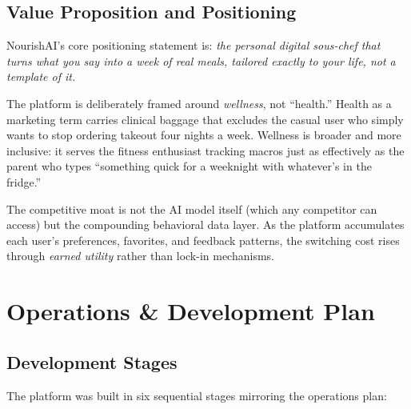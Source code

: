 \documentclass[12pt,letterpaper]{article}
\begin{document}
\subsection{Value Proposition and Positioning}

NourishAI's core positioning statement is: \textit{the personal digital sous-chef that turns
what you say into a week of real meals, tailored exactly to your life, not a template of it.}

The platform is deliberately framed around \textit{wellness}, not ``health.'' Health as a
marketing term carries clinical baggage that excludes the casual user who simply wants to
stop ordering takeout four nights a week. Wellness is broader and more inclusive: it
serves the fitness enthusiast tracking macros just as effectively as the parent who types
``something quick for a weeknight with whatever's in the fridge.''

The competitive moat is not the AI model itself (which any competitor can access) but the
compounding behavioral data layer. As the platform accumulates each user's preferences,
favorites, and feedback patterns, the switching cost rises through \textit{earned utility}
rather than lock-in mechanisms.

\section{Operations \& Development Plan}
\label{sec:ops}

\subsection{Development Stages}

The platform was built in six sequential stages mirroring the operations plan:
\end{document}

